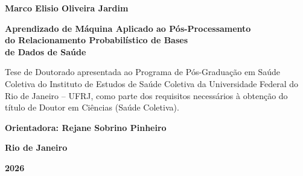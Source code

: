 \documentclass[12pt,a4paper,openany]{book}
\begin{document}

\newpage

\thispagestyle{empty}

\begin{center}

{\large \bf Marco Elisio Oliveira Jardim}

\vspace{40pt}

{\Large \bf Aprendizado de M\'aquina Aplicado ao P\'os-Processamento\\do Relacionamento Probabil\'istico de Bases\\de Dados de Sa\'ude}

\vspace{50pt}

\begin{flushright}
\parbox{10.3cm}{Tese de Doutorado apresentada ao Programa de P\'os-Gradua\c{c}\~ao em Sa\'ude Coletiva do Instituto de Estudos de Sa\'ude Coletiva da Universidade Federal do Rio de Janeiro -- UFRJ, como parte dos requisitos necess\'arios \`a obten\c{c}\~ao do t\'itulo de Doutor em Ci\^encias (Sa\'ude Coletiva).\par
\vspace{18pt}\par
{\large \bf Orientadora: Rejane Sobrino Pinheiro}\par
\vspace{12pt}\par}
\end{flushright}

\vspace{\fill}

\textbf{Rio de Janeiro}

\textbf{2026}

\end{center}





\newpage
\mbox{}\vspace{5cm}
\end{document}
